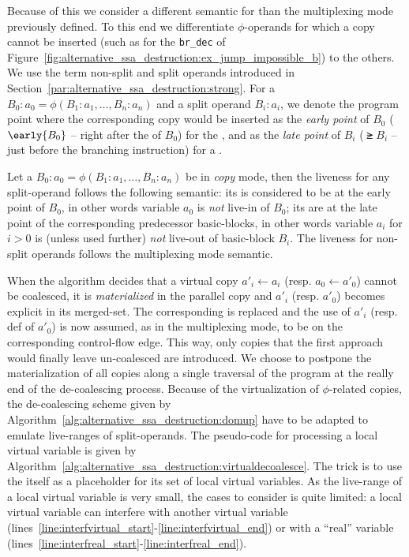 Because of this we consider a different semantic for \phifuns than the multiplexing mode previously defined. 
To this end we differentiate $\phi$-operands for which a copy cannot be inserted (such as for the \texttt{br\_dec} of Figure~\ref{fig:alternative_ssa_destruction:ex_jump_impossible_b}) to the others. 
We use the term non-split and split operands introduced in Section~\ref{par:alternative_ssa_destruction:strong}. 
For a \phifun $B_0:a_0=\phi(B_1:a_1,\dots,B_n:a_n)$ and a split operand $B_i:a_i$, we denote the program point where the corresponding copy would be inserted as the \emph{early point} of $B_0$ ($\early{B_0}$ -- right after the \phifuns of $B_0$) for the , and as the \emph{late point} of $B_i$ ($\late{B_i}$ -- just before the branching instruction) for a \useop.
\begin{definition}
Let a \phifun $B_0:a_0=\phi(B_1:a_1,\dots,B_n:a_n)$ be in \emph{copy} mode, then the liveness for any split-operand follows the following semantic: its  is considered to be at the early point of $B_0$, in other words variable $a_0$ is \emph{not} live-in of $B_0$; its \useops are at the late point of the corresponding predecessor basic-blocks, in other words variable $a_i$ for $i>0$ is (unless used further) \emph{not} live-out of basic-block $B_i$. The liveness for non-split operands follows the multiplexing mode semantic. 
\end{definition}

When the algorithm decides that a virtual copy $a'_i \gets a_i$ (resp. 
$a_0 \gets a'_0$) cannot be coalesced, it is \emph{materialized} in the parallel copy and $a'_i$ (resp. 
$a'_0$) becomes explicit in its merged-set. 
The corresponding \phiop is replaced and the use of $a'_i$ (resp. 
def of $a'_0$) is now assumed, as in the multiplexing mode, to be on the corresponding control-flow edge. 
This way, only copies that the first approach would finally leave un-coalesced are introduced. 
We choose to postpone the materialization of all copies along a single traversal of the program at the really end of the de-coalescing process. 
Because of the virtualization of $\phi$-related copies, the de-coalescing scheme given by Algorithm~\ref{alg:alternative_ssa_destruction:domup} have to be adapted to emulate live-ranges of split-operands. 
The pseudo-code for processing a local virtual variable is given by Algorithm~\ref{alg:alternative_ssa_destruction:virtualdecoalesce}. 
The trick is to use the \phifun itself as a placeholder for its set of local virtual variables. 
As the live-range of a local virtual variable is very small, the cases to consider is quite limited: 
a local virtual variable can interfere with another virtual variable (lines~\ref{line:interfvirtual_start}-\ref{line:interfvirtual_end}) or with a ``real'' variable (lines~\ref{line:interfreal_start}-\ref{line:interfreal_end}).

